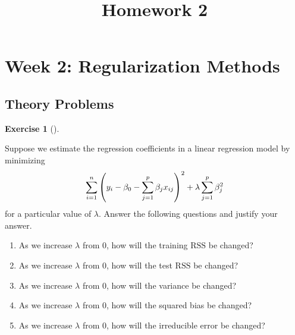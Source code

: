 \documentclass[
  english,
]{article}
\title{Homework 2}
\author{}
\date{}
\providecommand{\tightlist}{%
  \setlength{\itemsep}{0pt}\setlength{\parskip}{0pt}}
\newcommand{\rss}{\mathrm{RSS}}
\theoremstyle{definition}
\theoremstyle{definition}
\newtheorem{exercise}{Exercise}[section]
\theoremstyle{remark}
\begin{document}
\maketitle


\section{Week 2: Regularization
Methods}\label{week-2-regularization-methods}

\subsection{Theory Problems}\label{theory-problems}

\begin{exercise}[]\protect\hypertarget{exr-}{}\label{exr-}

Suppose we estimate the regression coefficients in a linear regression
model by minimizing \[
\sum_{i=1}^n\qty(y_i-\beta_0-\sum_{j=1}^p\beta_jx_{ij})^2+\lambda\sum_{j=1}^p\beta_j^2
\] for a particular value of \(\lambda\). Answer the following questions
and justify your answer.

\begin{enumerate}
\def\labelenumi{\alph{enumi}.}
\tightlist
\item
  As we increase \(\lambda\) from \(0\), how will the training \(\rss\)
  be changed?
\item
  As we increase \(\lambda\) from \(0\), how will the test \(\rss\) be
  changed?
\item
  As we increase \(\lambda\) from \(0\), how will the variance be
  changed?
\item
  As we increase \(\lambda\) from \(0\), how will the squared bias be
  changed?
\item
  As we increase \(\lambda\) from \(0\), how will the irreducible error
  be changed?
\end{enumerate}

\end{exercise}
\end{document}
